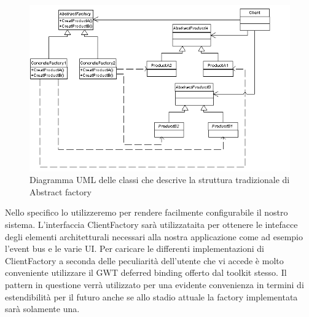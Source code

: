 \begin{figure}[h]
\centering
\includegraphics[width=13cm]{img/ST/as.png}
\caption{Diagramma UML delle classi che descrive la struttura tradizionale di
Abstract factory}
\end{figure}
Nello specifico lo utilizzeremo per rendere facilmente configurabile il nostro
sistema. L'interfaccia ClientFactory sar\`a utilizzataita per ottenere le
intefacce degli elementi architetturali necessari alla nostra applicazione come
ad esempio l'event bus e le varie UI.
Per caricare le differenti implementazioni di ClientFactory a seconda delle
peculiarit\`a dell'utente che vi accede \`e molto conveniente utilizzare il GWT
deferred binding offerto dal toolkit stesso.
Il pattern in questione verr\`a utilizzato per una evidente convenienza in termini
di estendibilit\`a per il futuro anche se allo stadio attuale la factory
implementata sar\`a solamente una.

\newpage
